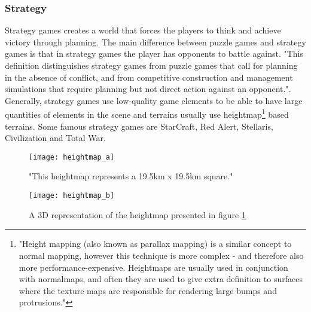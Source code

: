 \subsubsection{Strategy}
Strategy games creates a world that forces the players to think and achieve victory through planning. The main difference between puzzle games and strategy games is that in strategy games the player has opponents to battle against\cite{FundamentalsOfGameDesign}. "This definition distinguishes strategy games from puzzle games that call for planning in the absence of conflict, and from competitive construction and management
simulations that require planning but not direct action against an opponent."\cite{FundamentalsOfGameDesign}. Generally, strategy games use low-quality game elements to be able to have large quantities of elements in the scene and terrains usually use heightmap\footnote{"Height mapping (also known as parallax mapping) is a similar concept to normal mapping, however this technique is more complex - and therefore also more performance-expensive. Heightmaps are usually used in conjunction with normalmaps, and often they are used to give extra definition to surfaces where the texture maps are responsible for rendering large bumps and protrusions."\cite{UnityHeightMap}} based terrains\cite{GameEngineArchitecture}. Some famous strategy games are StarCraft, Red Alert, Stellaris, Civilization  and Total War\cite{StrategyGames}.

\begin{figure}[!h] \centering \texttt{[image: heightmap\_a]} \caption{"This heightmap represents a 19.5km x 19.5km square."\cite{HeightmapRenderingUsingAFloorcastingAlgorithm}} \label{fig:heightmap-a} \end{figure}

\begin{figure}[!h] \centering \texttt{[image: heightmap\_b]} \caption{A 3D representation of the heightmap presented in figure \ref{fig:heightmap-a} \cite{HeightmapRenderingUsingAFloorcastingAlgorithm}} \label{fig:heightmap-b} \end{figure}